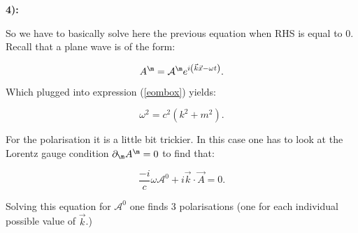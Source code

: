 \textbf{4):}

So we have to basically solve here the previous equation when RHS is equal to 0. Recall that a plane wave is of the form:

\begin{equation}
	\vau{\m} = \mathcal{A}^{\m} e^{i\left(\vec{k}\vec{x}-\omega t\right)}.
\end{equation}

Which plugged into expression (\ref{eombox}) yields:

\begin{equation}
	\omega^{2}= c^{2}( k^{2} + m^{2}).
\end{equation}

For the polarisation it is a little bit trickier. In this case one has to look at the Lorentz gauge condition $\pd{\m}\vau{\m}=0$ to find that:

\begin{equation}
	\frac{-i}{c}\omega \mathcal{A}^{0} + i \vec{k}\cdot \vec{A} = 0. 
\end{equation}

Solving this equation for $\mathcal{A}^{0}$ one finds 3 polarisations (one for each individual possible value of $\vec{k}$.)








